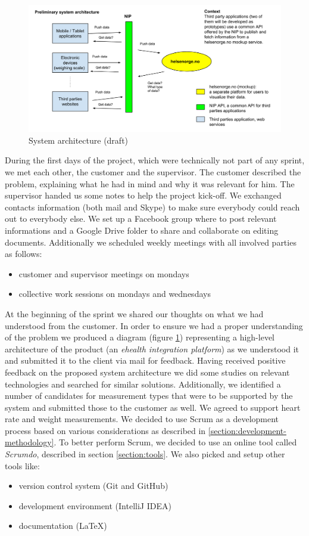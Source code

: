 \begin{figure}[h]
\centering
\includegraphics[scale=0.30]{../Figures/architecture-draft.png}
\caption{System architecture (draft)}
\label{figure:architecture-draft}
\end{figure}

During the first days of the project, which were technically not part of any sprint,
we met each other, the customer and the supervisor.
The customer described the problem, explaining what he had in mind and why it was relevant for him.
The supervisor handed us some notes to help the project kick-off.
We exchanged contacts information (both mail and Skype) to make sure everybody could reach out to
everybody else. We set up a Facebook group where to post relevant informations
and a Google Drive folder to share and collaborate on editing documents.
Additionally we scheduled weekly meetings with all involved parties as follows:
\begin{itemize}
\item customer and supervisor meetings on mondays
\item collective work sessions on mondays and wednesdays
\end{itemize}
At the beginning of the sprint we shared our thoughts on what we had understood from the customer.
In order to ensure we had a proper understanding of the problem we produced a diagram
(figure \ref{figure:architecture-draft}) representing a high-level architecture
of the product (an \textit{ehealth integration platform}) as we understood it and submitted
it to the client via mail for feedback.
Having received positive feedback on the proposed system architecture we did some studies
on relevant technologies and searched for similar solutions.
Additionally, we identified a number of candidates for measurement types that were to be supported
by the system and submitted those to the customer as well. We agreed to support heart rate and
weight measurements.
We decided to use Scrum as a development process based on various considerations as
described in \ref{section:development-methodology}. To better perform Scrum, we decided
to use an online tool called \textit{Scrumdo}, described in section \ref{section:tools}.
We also picked and setup other tools like:
\begin{itemize}
\item version control system (Git and GitHub)
\item development environment (IntelliJ IDEA)
\item documentation (LaTeX)
\end{itemize}


